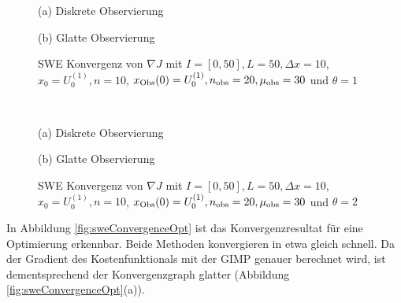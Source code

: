 \begin{figure}[H]
\footnotesize
\begin{minipage}[b]{0.49\linewidth}
\centering

\caption*{(a) Diskrete Observierung}
\end{minipage}
\begin{minipage}[b]{0.49\linewidth}
\centering

\caption*{(b) Glatte Observierung}
\end{minipage}
\caption{SWE Konvergenz von $\nabla J$ mit $I=[0,50],L=50,\Delta x=10$, $x_0=U_0^{(1)},n=10$, $x_{\text{Obs}}(0) = U_0^{(1)}, n_{\text{obs}}=20,\mu_{\text{obs}}=30$ und $\theta=1$}
\label{fig:sweConvergenceAdjoint}
% 
\quad\\[0.3cm]
\begin{minipage}[b]{0.49\linewidth}
\centering

% 
\caption*{(a) Diskrete Observierung}
\end{minipage}
\begin{minipage}[b]{0.49\linewidth}
\centering

% 
\caption*{(b) Glatte Observierung}
\end{minipage}
\caption{SWE Konvergenz von $\nabla J$ mit $I=[0,50],L=50,\Delta x=10$, $x_0=U_0^{(1)},n=10$, $x_{\text{Obs}}(0) = U_0^{(1)}, n_{\text{obs}}=20,\mu_{\text{obs}}=30$ und $\theta=2$}
\label{fig:sweConvergenceAdjoint1}
\end{figure}


In Abbildung \ref{fig:sweConvergenceOpt} ist das Konvergenzresultat für eine Optimierung erkennbar. Beide Methoden konvergieren in etwa gleich schnell.
Da der Gradient des Kostenfunktionals mit der GIMP genauer berechnet wird, ist dementsprechend der Konvergenzgraph glatter (Abbildung \ref{fig:sweConvergenceOpt}(a)). 

